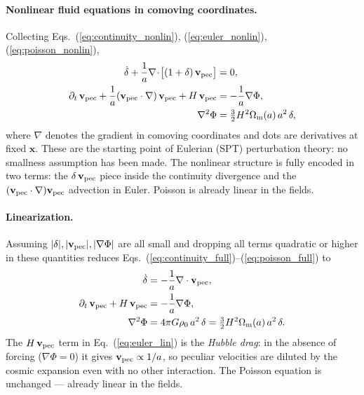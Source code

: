 \documentclass[12pt]{article}
\newcommand{\bx}{\mathbf{x}}
\newcommand{\bv}{\mathbf{v}}
\newcommand{\Omm}{\Omega_{\rm m}}
\begin{document}
\paragraph{Nonlinear fluid equations in comoving coordinates.}
Collecting Eqs.~(\ref{eq:continuity_nonlin}), (\ref{eq:euler_nonlin}),
(\ref{eq:poisson_nonlin}),
%
\begin{align}
  \dot\delta
    + \frac{1}{a}\nabla\!\cdot\!\bigl[(1+\delta)\,\bv_{\rm pec}\bigr]
    &= 0,
  \label{eq:continuity_full}\\
  \partial_t\,\bv_{\rm pec}
    + \frac{1}{a}(\bv_{\rm pec}\cdot\nabla)\,\bv_{\rm pec}
    + H\,\bv_{\rm pec}
    &= -\frac{1}{a}\nabla\Phi,
  \label{eq:euler_full}\\
  \nabla^2\Phi
    &= \tfrac{3}{2}H^2\Omm(a)\,a^2\,\delta,
  \label{eq:poisson_full}
\end{align}
%
where $\nabla$ denotes the gradient in comoving coordinates and dots
are derivatives at fixed $\bx$.  These are the starting point of
Eulerian (SPT) perturbation theory: no smallness assumption has been
made.  The nonlinear structure is fully encoded in two terms: the
$\delta\,\bv_{\rm pec}$ piece inside the continuity divergence and the
$(\bv_{\rm pec}\cdot\nabla)\bv_{\rm pec}$ advection in Euler.  Poisson is
already linear in the fields.

\paragraph{Linearization.}  Assuming $|\delta|, |\bv_{\rm pec}|,
|\nabla\Phi|$ are all small and dropping all terms quadratic or
higher in these quantities reduces
Eqs.~(\ref{eq:continuity_full})--(\ref{eq:poisson_full}) to
%
\begin{align}
  \dot\delta
    &= -\frac{1}{a}\nabla\cdot\bv_{\rm pec},
  \label{eq:continuity_lin}\\
  \partial_t\,\bv_{\rm pec} + H\,\bv_{\rm pec}
    &= -\frac{1}{a}\nabla\Phi,
  \label{eq:euler_lin}\\
  \nabla^2\Phi
    &= 4\pi G\rho_0\,a^2\,\delta
     = \tfrac{3}{2}H^2\Omm(a)\,a^2\,\delta.
  \label{eq:poisson_lin}
\end{align}
%
The $H\,\bv_{\rm pec}$ term in Eq.~(\ref{eq:euler_lin}) is the
\emph{Hubble drag}: in the absence of forcing
($\nabla\Phi = 0$) it gives $\bv_{\rm pec} \propto 1/a$, so peculiar
velocities are diluted by the cosmic expansion even with no other
interaction.  The Poisson equation is unchanged --- already linear in
the fields.
\end{document}

